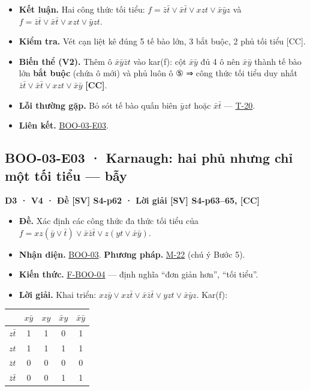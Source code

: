 \documentclass[
  10pt,
  twoside,openany]{book}
\providecommand{\tightlist}{%
  \setlength{\itemsep}{0pt}\setlength{\parskip}{0pt}}
\begin{document}
\begin{itemize}
\tightlist
\item
  \textbf{Kết luận.} Hai công thức tối tiểu:
  \(f=\bar z\bar t\vee\bar x\bar t\vee xzt\vee\bar x\bar yz\) và
  \(f=\bar z\bar t\vee\bar x\bar t\vee xzt\vee\bar yzt\).
\item
  \textbf{Kiểm tra.} Vét cạn liệt kê đúng 5 tế bào lớn, 3 bắt buộc, 2
  phủ tối tiểu {[}CC{]}.
\item
  \textbf{Biến thể (V2).} Thêm ô \(\bar x\bar y\bar zt\) vào kar(f): cột
  \(\bar x\bar y\) đủ 4 ô nên \(\bar x\bar y\) thành tế bào lớn
  \textbf{bắt buộc} (chứa ô mới) và phủ luôn ô ⑤ ⇒ công thức tối tiểu
  duy nhất \(\bar z\bar t\vee\bar x\bar t\vee xzt\vee\bar x\bar y\)
  \textbf{{[}CC{]}}.
\item
  \textbf{Lỗi thường gặp.} Bỏ sót tế bào quấn biên \(\bar yzt\) hoặc
  \(\bar x\bar t\) --- \protect\hyperlink{T-20}{T-20}.
\item
  \textbf{Liên kết.} \protect\hyperlink{BOO-03-E03}{BOO-03-E03}.
\end{itemize}

\hypertarget{BOO-03-E03}{%
\subsection{BOO-03-E03 · Karnaugh: hai phủ nhưng chỉ một tối tiểu ---
bẫy}\label{BOO-03-E03}}

\textbf{D3 · V4 · Đề {[}SV{]} S4-p62 · Lời giải {[}SV{]} S4-p63--65,
{[}CC{]}}

\begin{itemize}
\tightlist
\item
  \textbf{Đề.} Xác định các công thức đa thức tối tiểu của
  \(f=xz(\bar y\vee\bar t)\vee\bar x\bar z\bar t\vee z(yt\vee\bar x\bar y)\).
\item
  \textbf{Nhận diện.} \protect\hyperlink{BOO-03}{BOO-03}. \textbf{Phương
  pháp.} \protect\hyperlink{M-22}{M-22} (chú ý Bước 5).
\item
  \textbf{Kiến thức.} \protect\hyperlink{F-BOO-04}{F-BOO-04} --- định
  nghĩa ``đơn giản hơn'', ``tối tiểu''.
\item
  \textbf{Lời giải.} Khai triển:
  \(xz\bar y\vee xz\bar t\vee\bar x\bar z\bar t\vee yzt\vee\bar x\bar yz\).
  Kar(f):
\end{itemize}

\begin{longtable}[]{@{}lcccc@{}}
\toprule\noalign{}
& \(x\bar y\) & \(xy\) & \(\bar xy\) & \(\bar x\bar y\) \\
\midrule\noalign{}
\endhead
\bottomrule\noalign{}
\endlastfoot
\(z\bar t\) & 1 & 1 & 0 & 1 \\
\(zt\) & 1 & 1 & 1 & 1 \\
\(\bar zt\) & 0 & 0 & 0 & 0 \\
\(\bar z\bar t\) & 0 & 0 & 1 & 1 \\
\end{longtable}
\end{document}
